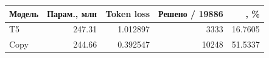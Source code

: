 \begin{tabular}{lrrrr}
\toprule
Модель & Парам., млн & Token loss & Решено / 19886 & \pass{}, \% \\
\midrule
T5 & 247.31 & 1.012897 & 3333 & 16.7605 \\
Copy & 244.66 & 0.392547 & 10248 & 51.5337 \\
\bottomrule
\end{tabular}
